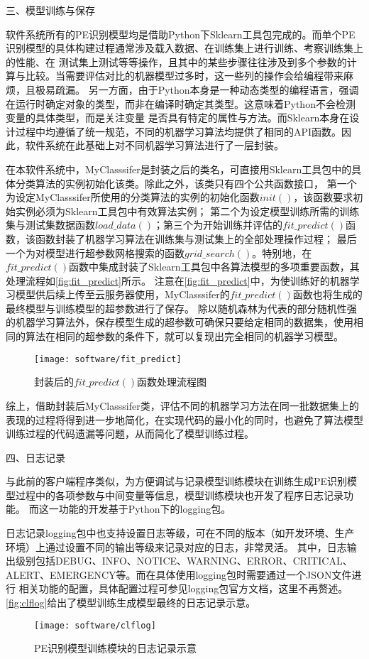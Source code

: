 三、模型训练与保存

软件系统所有的PE识别模型均是借助Python下Sklearn工具包完成的。而单个PE识别模型的具体构建过程通常涉及载入数据、在训练集上进行训练、考察训练集上的性能、在
测试集上测试等等操作，且其中的某些步骤往往涉及到多个参数的计算与比较。当需要评估对比的机器模型过多时，这一些列的操作会给编程带来麻烦，且极易疏漏。
另一方面，由于Python本身是一种动态类型的编程语言，强调在运行时确定对象的类型，而非在编译时确定其类型。这意味着Python不会检测变量的具体类型，而是关注变量
是否具有特定的属性与方法。而Sklearn本身在设计过程中均遵循了统一规范，不同的机器学习算法均提供了相同的API函数。因此，软件系统在此基础上对不同机器学习算法进行了一层封装。

在本软件系统中，MyClasssifer是封装之后的类名，可直接用Sklearn工具包中的具体分类算法的实例初始化该类。除此之外，该类只有四个公共函数接口，
第一个为设定MyClasssifer所使用的分类算法的实例的初始化函数$init()$，该函数要求初始实例必须为Sklearn工具包中有效算法实例；
第二个为设定模型训练所需的训练集与测试集数据函数$load\_data()$；第三个为开始训练并评估的$fit\_predict()$函数，该函数封装了机器学习算法在训练集与测试集上的全部处理操作过程；
最后一个为对模型进行超参数网格搜索的函数$grid\_search()$。特别地，在$fit\_predict()$函数中集成封装了Sklearn工具包中各算法模型的多项重要函数，其处理流程如\autoref{fig:fit_predict}所示。
注意在\autoref{fig:fit_predict}中，为使训练好的机器学习模型供后续上传至云服务器使用，MyClasssifer的$fit\_predict()$函数也将生成的最终模型与训练模型的超参数进行了保存。
除以随机森林为代表的部分随机性强的机器学习算法外，保存模型生成的超参数可确保只要给定相同的数据集，使用相同的算法在相同的超参数的条件下，就可以复现出完全相同的机器学习模型。

\begin{figure}[h]
    \centering
    \texttt{[image: software/fit\_predict]}
    \caption{\label{fig:fit_predict}封装后的$fit\_predict()$函数处理流程图}
\end{figure}

综上，借助封装后MyClasssifer类，评估不同的机器学习方法在同一批数据集上的表现的过程将得到进一步地简化，在实现代码的最小化的同时，也避免了算法模型训练过程的代码遗漏等问题，从而简化了模型训练过程。

四、日志记录

与此前的客户端程序类似，为方便调试与记录模型训练模块在训练生成PE识别模型过程中的各项参数与中间变量等信息，模型训练模块也开发了程序日志记录功能。
而这一功能的开发基于Python下的logging包。

日志记录logging包中也支持设置日志等级，可在不同的版本（如开发环境、生产环境）上通过设置不同的输出等级来记录对应的日志，非常灵活。
其中，日志输出级别包括DEBUG、INFO、NOTICE、WARNING、ERROR、CRITICAL、ALERT、EMERGENCY等。而在具体使用logging包时需要通过一个JSON文件进行
相关功能的配置，具体配置过程可参见logging包官方文档，这里不再赘述。\autoref{fig:clflog}给出了模型训练生成模型最终的日志记录示意。
\begin{figure}[htbp]
    \centering
    \texttt{[image: software/clflog]}
    \caption{\label{fig:clflog}PE识别模型训练模块的日志记录示意}
\end{figure}

